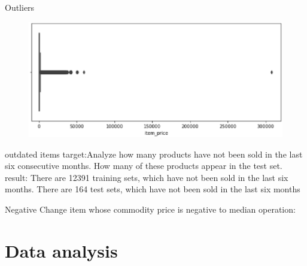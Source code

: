 \documentclass[
 size=14pt,
 paper=smartboard,  %
 mode=present, 		%
 display=slides, 	%
 style=tuliplab,  	%
 pauseslide,
 fleqn,leqno]{powerdot}
\begin{document}
\begin{slide}[toc=,bm=]{Outliers}
  \begin{figure}
    \includegraphics[scale=0.5]{picture/data_8.eps}
  \end{figure}
\end{slide}

\begin{slide}[toc=,bm=]{outdated items}
  target:Analyze how many products have not been sold in the last six consecutive months. How many of these products appear in the test set.
  result:
  There are 12391 training sets, which have not been sold in the last six months.
  There are 164 test sets, which have not been sold in the last six months
\end{slide}

\begin{slide}[toc=,bm=]{Negative}
  Change item whose commodity price is negative to median
  operation:
\end{slide}

\section{Data analysis}
\end{document}
